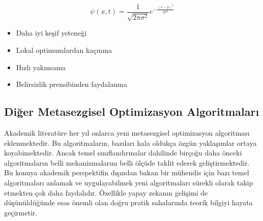 \begin{equation}
\psi(x,t) = \frac{1}{\sqrt{2\pi\sigma^2}} e^{-\frac{(x-\mu)^2}{2\sigma^2}}
\end{equation}

\begin{tcolorbox}[title=Kuantum Mekanizmasının Avantajları]
\begin{itemize}
    \item Daha iyi keşif yeteneği
    \item Lokal optimumlardan kaçınma
    \item Hızlı yakınsama
    \item Belirsizlik prensibinden faydalanma
\end{itemize}
\end{tcolorbox}

\subsection{Diğer Metasezgisel Optimizasyon Algoritmaları}
Akademik literatüre her yıl onlarca yeni metasezgisel optimizasyon algoritması eklenmektedir. Bu algoritmaların, bazıları hala oldukça özgün yaklaşımlar ortaya koyabimektedir. Ancak temel sınıflandırmalar dahilinde birçoğu daha önceki algoritmaların belli mekanizmalarını belli ölçüde taklit ederek geliştirmektedir. Bu konuya akademik perspektifin dışından bakan bir mühendis için bazı temel algoritmaları anlamak ve uygulayabilmek yeni algoritmaları sürekli olarak takip etmekten çok daha faydalıdır. Özellikle yapay zekanın gelişimi de düşünüldüğünde esas önemli olan doğru pratik sahalarında teorik bilgiyi hayata geçirmetir.

